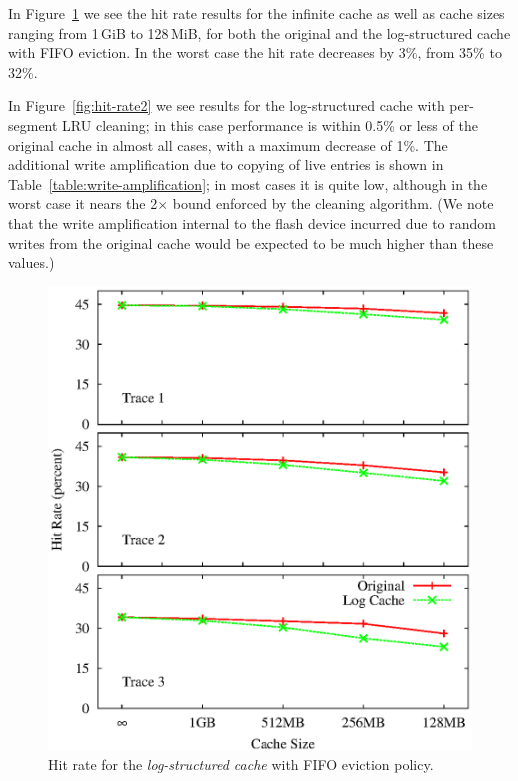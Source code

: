 \documentclass[letterpaper,twocolumn,10pt]{article}
\begin{document}
 In Figure~\ref{fig:hit-rate} we see the hit rate results for
the infinite cache as well as cache sizes ranging from 1\,GiB to
128\,MiB, for both the original and the log-structured cache with FIFO
eviction. In the worst case the hit rate decreases by 3\%, from 35\% to 32\%.

In Figure~\ref{fig:hit-rate2} we see results for the log-structured cache with
per-segment LRU cleaning; in this case performance is within 0.5\% or less of
the original cache in almost all cases, with a maximum decrease of 1\%. The
additional write amplification due to copying of live entries is shown in
Table~\ref{table:write-amplification}; in most cases it is quite low, although
in the worst case it nears the 2$\times$ bound enforced by the cleaning
algorithm. (We note that the write amplification internal to the flash device
incurred due to random writes from the original cache would be expected to be
much higher than these values.)

\begin{figure}[t]
  \begin{center}
    \includegraphics[width=0.9\columnwidth]{graphs/hit-rate-2}
  \end{center}
  \caption{Hit rate for the \emph{log-structured cache} with FIFO eviction
    policy.}
  \label{fig:hit-rate} 
\vspace{-0.2in}
\end{figure}
\end{document}
